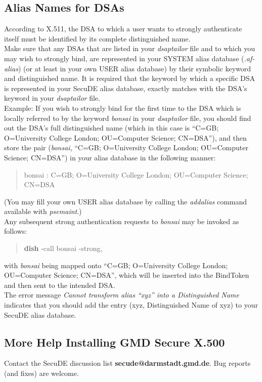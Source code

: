 \subsection{Alias Names for DSAs}
\label{dsaaliases}
According to X.511, the DSA to which a user wants to strongly authenticate itself
must be identified by its complete distinguished name.
\\ [1em]
Make sure that any DSAs that are listed in your {\em dsaptailor} file and to which you may
wish to strongly bind, are represented in your SYSTEM alias database
({\em .af-alias}) (or at least in your own USER alias database) by their symbolic keyword and 
distinguished name.
It is required that the keyword by which a specific DSA is represented in your 
SecuDE alias database, exactly matches with the DSA's keyword in your {\em dsaptailor} file.
\\ [1em]
Example: If you wish to strongly bind for the first time to the DSA which is locally referred
to by the keyword {\em bonsai} in your {\em dsaptailor} file, you should find out the DSA's full
distinguished name (which in this case is 
``C=GB; O=University College London; OU=Computer Science; CN=DSA''),
and then store the pair ({\em bonsai}, ``C=GB; O=University College London; OU=Computer Science; CN=DSA'') in your alias database in the following manner:
\begin{quote}
{\small bonsai : C=GB; O=University College London; OU=Computer Science; CN=DSA}
\end{quote}
(You may fill your own USER alias database by calling the {\em addalias} command available with
{\em psemaint}.)
\\ [1em]
Any subsequent strong authentication requests to {\em bonsai} may be invoked as follows:
\begin{quote}
{\bf dish} -call bonsai -strong,
\end{quote}
with {\em bonsai} being mapped onto ``C=GB; O=University College London; OU=Computer Science; CN=DSA'',
which will be inserted into the BindToken and then sent to the intended DSA.
\\ [1em]
The error message {\em Cannot transform alias ``xyz'' into a Distinguished Name} indicates that you
should add the entry (xyz, Distinguished Name of xyz) to your SecuDE alias database.


\subsection{More Help Installing GMD Secure X.500}
Contact the SecuDE discussion list {\bf secude@darmstadt.gmd.de}. Bug reports (and fixes) are
welcome.
